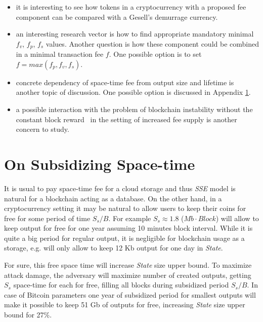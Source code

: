 \documentclass[]{llncs}   %
\newcommand{\esse}{\textit{SSE}}
\newcommand{\state}{\textit{State}}
\begin{document}
\begin{itemize}
  \item{}it is interesting to see how tokens in a cryptocurrency with a proposed fee component can be compared with a Gesell's demurrage currency\cite{gesell1958natural}.
  \item{}an interesting research vector is how to find appropriate mandatory minimal $f_v$, $f_p$, $f_s$ values. Another question is how these component could be combined in a minimal transaction fee $f$. One possible option is to set $f = max(f_p, f_v, f_s)$.
  \item{}concrete dependency of space-time fee from output size and lifetime is another topic of discussion. One possible option is discussed in Appendix \ref{sec:subsidy}.
  \item{}a possible interaction with the problem of blockchain instability without the constant block reward~\cite{carlsten2016instability} in the setting of increased fee supply is another concern to study.
\end{itemize}




\appendix

\section{On Subsidizing Space-time}
\label{sec:subsidy}

It is usual to pay space-time fee for a cloud storage and thus \esse{} model is natural for a blockchain acting as a database. On the other hand, in a cryptocurrency setting it may be natural to allow users to keep their coins for free for some period of time $S_s/B$. For example $S_s \approx 1.8$ ($Mb \cdot Block$) will allow to keep output for free for one year assuming 10 minutes block interval. While it is quite a big period for regular output, it is negligible for blockchain usage as a storage, e.g. will only allow to keep 12 Kb output for one day in \state{}.

For sure, this free space time will increase \state{} size upper bound. To maximize attack damage, the adversary will maximize number of created outputs, getting $S_s$ space-time for each for free, filling all blocks during subsidized period $S_s/B$. In case of Bitcoin parameters one year of subsidized period for smallest outputs will make it possible to keep 51 Gb of outputs for free, increasing \state{} size upper bound for 27\%.
\end{document}
